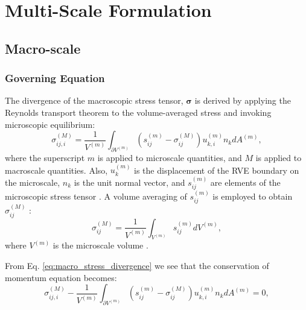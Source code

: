 \chapter{Multi-Scale Formulation}

\section{Macro-scale}

\subsection{Governing Equation}

The divergence of the macroscopic stress tensor, $\pmb{\sigma}$ is derived by applying the Reynolds transport theorem to the volume-averaged stress and invoking microscopic equilibrium:
%
\begin{equation}
\sigma_{ij,i}^{(M)} = \frac{1}{V^{(m)}} \int_{\partial V^{(m)}} \left( s_{ij}^{(m)} - \sigma_{ij}^{(M)} \right)u_{k,i}^{(m)} n_k dA^{(m)},
\label{eq:macro_stress_divergence}
\end{equation}
%
where the superscript \(m\) is applied to microscale quantities, and \(M\) is applied to macroscale quantities. Also, $u_k^{(m)}$ is the displacement of the RVE boundary on the microscale, $n_k$ is the unit normal vector, and $s_{ij}^{(m)}$ are elements of the microscopic stress tensor \cite{Chandran:2007hy,Stylianopoulos:2007dp}. A volume averaging of $s_{ij}^{(m)}$ is employed to obtain $\sigma_{ij}^{(M)}$ :
%
\begin{equation}
\sigma_{ij}^{(M)} = \frac{1}{V^{(m)}}\int_{V^{(m)}}s_{ij}^{(m)} dV^{(m)},
\label{eq:macro_stress_volume_avg}
\end{equation}
%
where $V^{(m)}$ is the microscale volume \cite{Chandran:2007hy}. 

From Eq. \eqref{eq:macro_stress_divergence} we see that the conservation of momentum equation becomes:
\begin{equation}
\sigma_{ij,i}^{(M)}-\frac{1}{V^{(m)}} \int_{\partial V^{(m)}} \left( s_{ij}^{(m)} - \sigma_{ij}^{(M)} \right)u_{k,i}^{(m)} n_k dA^{(m)}=0,
\label{eq:multi_cons_mom}
\end{equation}


